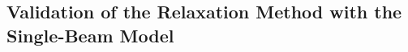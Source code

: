 






\subsection{\label{chap:halo-sec:line-sym}Validation of the Relaxation Method with the Single-Beam Model}


